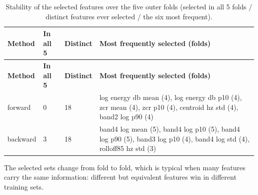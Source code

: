 \documentclass[11pt,a4paper]{article}
\begin{document}
\begin{center}\small\renewcommand{\arraystretch}{1.15}
\begin{longtable}{>{\raggedright\arraybackslash}p{1.55cm}>{\raggedleft\arraybackslash}p{1.55cm}>{\raggedleft\arraybackslash}p{1.55cm}>{\raggedright\arraybackslash}p{10.17cm}}
\caption{Stability of the selected features over the five outer folds (selected in all 5 folds / distinct features ever selected / the six most frequent).}\\
\toprule
\textbf{\hspace{0pt}Method} & \textbf{\hspace{0pt}In all 5} & \textbf{\hspace{0pt}Distinct} & \textbf{\hspace{0pt}Most frequently selected (folds)}\\\midrule\endfirsthead
\toprule
\textbf{\hspace{0pt}Method} & \textbf{\hspace{0pt}In all 5} & \textbf{\hspace{0pt}Distinct} & \textbf{\hspace{0pt}Most frequently selected (folds)}\\\midrule\endhead
\bottomrule\endfoot
\hspace{0pt}forward & \hspace{0pt}0 & \hspace{0pt}18 & \hspace{0pt}log energy db mean (4), log energy db p10 (4), zcr mean (4), zcr p10 (4), centroid hz std (4), band2 log p90 (4)\\
\hspace{0pt}backward & \hspace{0pt}3 & \hspace{0pt}18 & \hspace{0pt}band4 log mean (5), band4 log p10 (5), band4 log p90 (5), band3 log p10 (4), band4 log std (4), rolloff85 hz std (3)\\
\end{longtable}\end{center}
The selected sets change from fold to fold, which is typical when many features carry the same information: different but equivalent features win in different training sets.
\end{document}
